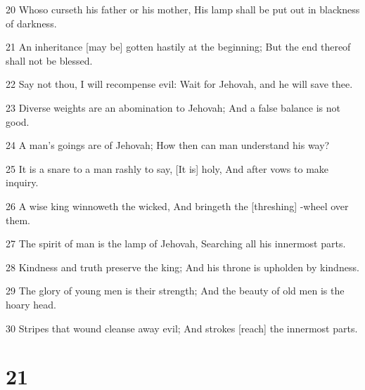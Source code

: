 \par 20 Whoso curseth his father or his mother, His lamp shall be put out in blackness of darkness.
\par 21 An inheritance [may be] gotten hastily at the beginning; But the end thereof shall not be blessed.
\par 22 Say not thou, I will recompense evil: Wait for Jehovah, and he will save thee.
\par 23 Diverse weights are an abomination to Jehovah; And a false balance is not good.
\par 24 A man's goings are of Jehovah; How then can man understand his way?
\par 25 It is a snare to a man rashly to say, [It is] holy, And after vows to make inquiry.
\par 26 A wise king winnoweth the wicked, And bringeth the [threshing] -wheel over them.
\par 27 The spirit of man is the lamp of Jehovah, Searching all his innermost parts.
\par 28 Kindness and truth preserve the king; And his throne is upholden by kindness.
\par 29 The glory of young men is their strength; And the beauty of old men is the hoary head.
\par 30 Stripes that wound cleanse away evil; And strokes [reach] the innermost parts.

\chapter{21}

